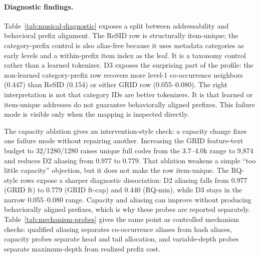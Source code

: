 \paragraph{Diagnostic findings.}
Table~\ref{tab:musical-diagnostic} exposes a split between addressability and
behavioral prefix alignment. The
ReSID row is structurally item-unique; the category-prefix control is also
alias-free because it uses metadata categories as early levels and a
within-prefix item index as the leaf. It is a taxonomy control rather than a
learned tokenizer. D3 exposes the surprising part of the profile: the
non-learned category-prefix row recovers
more level-1 co-occurrence neighbors (0.447) than ReSID (0.154) or either
GRID row (0.055--0.080). The right interpretation is not that category IDs
are better tokenizers. It is that learned or item-unique addresses do not
guarantee behaviorally aligned prefixes. This failure mode is visible only when
the mapping is inspected directly.

The capacity ablation gives an intervention-style check: a capacity change fixes
one failure mode without repairing another. Increasing the GRID feature-text budget to
32/1280/1280 raises unique full codes from the 3.7--4.0k range to 9,874 and
reduces D2 aliasing from 0.977 to 0.779. That ablation weakens a simple
``too little capacity'' objection, but it does not make the row item-unique.
The RQ-style rows expose a sharper diagnostic dissociation: D2 aliasing falls
from 0.977 (GRID ft) to 0.779 (GRID ft-cap) and 0.440 (RQ-min), while D3
stays in the narrow 0.055--0.080 range. Capacity and aliasing can improve
without producing behaviorally aligned prefixes, which is why these probes are
reported separately. Table~\ref{tab:mechanism-probes} gives the same point as
controlled mechanism checks: qualified aliasing separates co-occurrence aliases
from hash aliases, capacity probes separate head and tail allocation, and
variable-depth probes separate maximum-depth from realized prefix cost.

